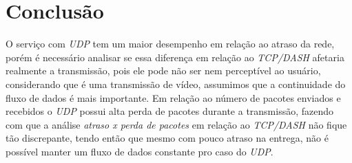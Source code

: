 \documentclass[12pt]{article}
\begin{document}
\FloatBarrier

\section{Conclusão}

	O serviço com \textit{UDP} tem um maior desempenho em relação ao atraso da rede, porém é necessário analisar se essa diferença em relação ao \textit{TCP/DASH} afetaria realmente a transmissão, pois ele pode não ser nem perceptível ao usuário, considerando que é uma transmissão de vídeo, assumimos que a continuidade do fluxo de dados é mais importante. Em relação ao número de pacotes enviados e recebidos o \textit{UDP} possui alta perda de pacotes durante a transmissão, fazendo com que a análise \textit{atraso x perda de pacotes} em relação ao \textit{TCP/DASH} não fique tão discrepante, tendo então que mesmo com pouco atraso na entrega, não é possível manter um fluxo de dados constante pro caso do \textit{UDP}.
    
\end{document}
